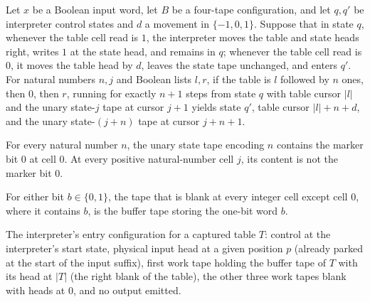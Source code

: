 \begin{lemma}
\label{Turing.universal_unary_copy}
\leanok
{}
Let $x$ be a Boolean input word, let $B$ be a four-tape configuration, and let $q,q'$ be
interpreter control states and $d$ a movement in $\{-1,0,1\}$. Suppose that in state
$q$, whenever the table cell read is $1$, the interpreter moves the table and state
heads right, writes $1$ at the state head, and remains in $q$; whenever the table cell
read is $0$, it moves the table head by $d$, leaves the state tape unchanged, and enters
$q'$. For natural numbers $n,j$ and Boolean lists $l,r$, if the table is $l$ followed by
$n$ ones, then $0$, then $r$, running for exactly $n+1$ steps from state $q$ with table
cursor $|l|$ and the unary state-$j$ tape at cursor $j+1$ yields state $q'$, table
cursor $|l|+n+d$, and the unary state-$(j+n)$ tape at cursor $j+n+1$.
\end{lemma}

\begin{lemma}
\label{Turing.universalStateTape_marker}
\leanok
{}
For every natural number $n$, the unary state tape encoding $n$ contains the marker bit
$0$ at cell $0$. At every positive natural-number cell $j$, its content is not the
marker bit $0$.
\end{lemma}

\begin{lemma}
\label{Turing.universal_install_marker}
\leanok
{}
For either bit $b\in\{0,1\}$, the tape that is blank at every integer cell except cell
$0$, where it contains $b$, is the buffer tape storing the one-bit word $b$.
\end{lemma}

\begin{definition}
\label{Turing.universalInterpreterInitial}
\leanok
{}
The interpreter's entry configuration for a captured table $T$: control at
the interpreter's start state, physical input head at a given position $p$
(already parked at the start of the input suffix), first work tape holding
the buffer tape of $T$ with its head at $|T|$ (the right blank of the
table), the other three work tapes blank with heads at $0$, and no output
emitted.
\end{definition}

